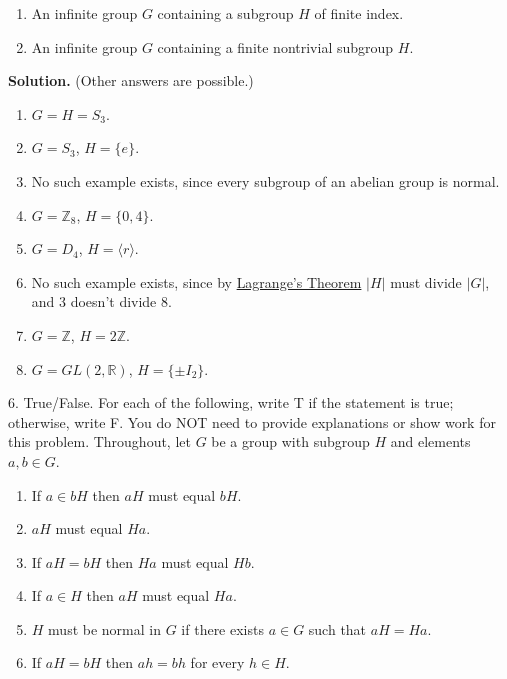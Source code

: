 \documentclass[10pt,]{book}
\theoremstyle{plain}
\theoremstyle{definition}
\theoremstyle{definition}
\theoremstyle{definition}
\theoremstyle{definition}
\numberwithin{equation}{section}
\def\Z{\mathbb{Z}}
\def\R{\mathbb{R}}
\begin{document}
\begin{exerciselist}
\begin{enumerate}[label=(\alph*)]
\item\hypertarget{li-454}{}An infinite group \(G\) containing a subgroup \(H\) of finite index.%
\item\hypertarget{li-455}{}An infinite group \(G\) containing a finite nontrivial subgroup \(H\).%
\end{enumerate}
%
\par\smallskip
\par\smallskip
\noindent\textbf{Solution.}\hypertarget{solution-54}{}\quad
(Other answers are possible.) \leavevmode%
\begin{enumerate}[label=(\alph*)]
\item\hypertarget{li-456}{}\(G=H=S_3\).%
\item\hypertarget{li-457}{}\(G=S_3\), \(H=\{e\}\).%
\item\hypertarget{li-458}{}No such example exists, since every subgroup of an abelian group is normal.%
\item\hypertarget{li-459}{}\(G=\Z_8\), \(H=\{0,4\}\).%
\item\hypertarget{li-460}{}\(G=D_4\), \(H=\langle r\rangle\).%
\item\hypertarget{li-461}{}No such example exists, since by \hyperref[lagrange]{Lagrange's Theorem} \(|H|\) must divide \(|G|\), and 3 doesn't divide 8.%
\item\hypertarget{li-462}{}\(G=\Z\), \(H=2\Z\).%
\item\hypertarget{li-463}{}\(G=GL(2,\R)\), \(H=\{\pm I_2\}\).%
\end{enumerate}
%
\item[6.]\hypertarget{exercise-55}{}True/False. For each of the following, write T if the statement is true; otherwise, write F. You do NOT need to provide explanations or show work for this problem. Throughout, let \(G\) be a group with subgroup \(H\) and elements \(a,b\in G\). \leavevmode%
\begin{enumerate}[label=(\alph*)]
\item\hypertarget{li-464}{}If \(a\in bH\) then \(aH\) must equal \(bH\).%
\item\hypertarget{li-465}{}\(aH\) must equal \(Ha\).%
\item\hypertarget{li-466}{}If \(aH=bH\) then \(Ha\) must equal \(Hb\).%
\item\hypertarget{li-467}{}If \(a\in H\) then \(aH\) must equal \(Ha\).%
\item\hypertarget{li-468}{}\(H\) must be normal in \(G\) if there exists \(a\in G\) such that \(aH=Ha\).%
\item\hypertarget{li-469}{}If \(aH=bH\) then \(ah=bh\) for every \(h\in H\).%

\end{enumerate}
\end{exerciselist}
\end{document}
